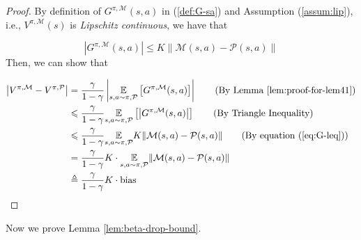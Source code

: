 \begin{proof}

By definition of $G^{\pi,\mathcal{M}}(s,a)$ in (\ref{def:G-sa}) and Assumption (\ref{assum:lip}), i.e., ${V}^{\pi,\mathcal{M}}(s)$ is \textit{Lipschitz continuous}, we have that

\begin{equation}\label{eq:G-leq}
|G^{\pi,\mathcal{M}}(s,a)|\leq K\|\mathcal{M}(s,a)-\mathcal{P}(s,a)\|
\end{equation}
Then, we can show that

\begin{align*}
\left|{V}^{\pi, \mathcal{M}}-{V}^{\pi, \mathcal{P}}\right| &= \frac{\gamma}{1-\gamma}\left|\underset{s,a\sim\pi,\mathcal{P}}{\mathbb{E}}\left[G^{\pi,\mathcal{M}}(s,a)\right]\right| \tag{By Lemma \ref{lem:proof-for-lem41}}\\
&\leq \frac{\gamma}{1-\gamma}\underset{s,a\sim\pi,\mathcal{P}}{\mathbb{E}}\left[\left|G^{\pi,\mathcal{M}}(s,a)\right|\right] \tag{By Triangle Inequality}\\
&\leq \frac{\gamma}{1-\gamma}\underset{s,a\sim\pi,\mathcal{P}}{\mathbb{E}}K\|\mathcal{M}(s,a)-\mathcal{P}(s,a)\| \tag{By equation (\ref{eq:G-leq})}\\
&= \frac{\gamma}{1-\gamma}K\cdot\underset{s,a\sim\pi,\mathcal{P}}{\mathbb{E}}\|\mathcal{M}(s,a)-\mathcal{P}(s,a)\|\\
&\triangleq \frac{\gamma}{1-\gamma}K\cdot\mathrm{bias}
\end{align*}

\end{proof}

\newpage

Now we prove Lemma \ref{lem:beta-drop-bound}.

